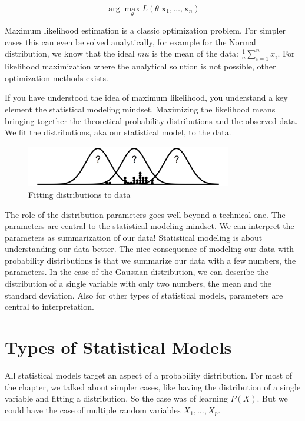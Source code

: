 \documentclass[
  10pt,
]{scrbook}
\begin{document}
\[\arg \max_{\theta} L(\theta | \mathbf{x}_1, \ldots, \mathbf{x}_n)\]

Maximum likelihood estimation is a classic optimization problem.
For simpler cases this can even be solved analytically, for example for the Normal distribution, we know that the ideal \(mu\) is the mean of the data: \(\frac{1}{n} \sum_{i=1}^n x_i\).
For likelihood maximization where the analytical solution is not possible, other optimization methods exists.

If you have understood the idea of maximum likelihood, you understand a key element the statistical modeling mindset.
Maximizing the likelihood means bringing together the theoretical probability distributions and the observed data.
We fit the distributions, aka our statistical model, to the data.

\begin{figure}

{\centering \includegraphics[width=0.8\textwidth]{figures/fit-1} 

}

\caption{Fitting distributions to data}\label{fig:fit}
\end{figure}

The role of the distribution parameters goes well beyond a technical one.
The parameters are central to the statistical modeling mindset.
We can interpret the parameters as summarization of our data!
Statistical modeling is about understanding our data better.
The nice consequence of modeling our data with probability distributions is that we summarize our data with a few numbers, the parameters.
In the case of the Gaussian distribution, we can describe the distribution of a single variable with only two numbers, the mean and the standard deviation.
Also for other types of statistical models, parameters are central to interpretation.

\hypertarget{types-of-statistical-models}{%
\section{Types of Statistical Models}\label{types-of-statistical-models}}

All statistical models target an aspect of a probability distribution.
For most of the chapter, we talked about simpler cases, like having the distribution of a single variable and fitting a distribution.
So the case was of learning \(P(X)\).
But we could have the case of multiple random variables \(X_1, \ldots, X_p\).
\end{document}
